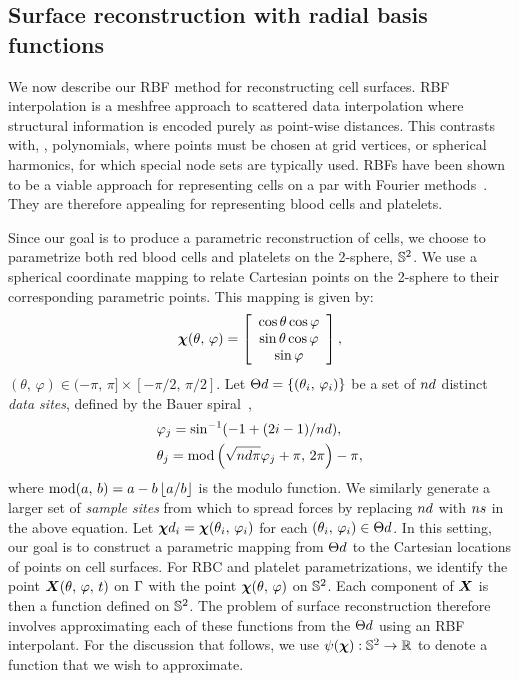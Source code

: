 \subsection{Surface reconstruction with radial basis functions}\label{sec:rbf-interpolation}

We now describe our RBF method for reconstructing cell surfaces. RBF interpolation is a
meshfree approach to scattered data interpolation where structural information is encoded
purely as point-wise distances. This contrasts with, , polynomials, where
points must be chosen at grid vertices, or spherical harmonics, for which special node
sets are typically used. RBFs have been shown to be a viable approach for representing
cells on a par with Fourier methods~\cite{Shankar:2013ki}. They are therefore appealing
for representing blood cells and platelets.

Since our goal is to produce a parametric reconstruction of cells, we choose to
parametrize both red blood cells and platelets on the 2-sphere, $\mathbb{S}^2$. We use a
spherical coordinate mapping to relate Cartesian points on the 2-sphere to their
corresponding parametric points. This mapping is given by:
\begin{equation}
    \boldsymbol{\chi}(\theta,\,\varphi) =
    \left[\begin{array}{c}
        \cos\theta\cos\varphi \\
        \sin\theta\cos\varphi \\
        \sin\varphi
    \end{array}\right],
\end{equation}
$(\theta,\,\varphi)\in(-\pi,\,\pi]\times[-\pi/2,\,\pi/2]$. Let
$\data\sites = \{(\theta_i,\,\varphi_i)\}$ be a set of $\data\cardinality$ distinct
\emph{data sites}, defined by the Bauer spiral~\cite{Bauer:2000km},
\begin{equation}\label{eq:bauer-spiral}
    \begin{aligned}
        &\varphi_j = \sin^{-1}(-1 + (2i - 1) / \data\cardinality), \\
        &\theta_j = \modulo\left(\sqrt{\data\cardinality\pi}\varphi_j + \pi,\,2\pi\right) - \pi,
    \end{aligned}
\end{equation}
where $\operatorname{mod}(a,\,b) = a - b\left\lfloor{a/b}\right\rfloor$ is the modulo function. We similarly generate
a larger set of \emph{sample sites} from which to spread forces by replacing $\data\cardinality$
with $\sample\cardinality$ in the above equation. Let
$\data\Xp_i=\Xp(\theta_i,\,\varphi_i)$ for each $(\theta_i,\,\varphi_i)\in\data\sites$.
In this setting, our goal is to construct a parametric mapping from $\data\sites$ to the
Cartesian locations of points on cell surfaces. For RBC and platelet parametrizations, we
identify the point $\boldsymbol{X}(\theta,\,\varphi,\,t)$ on $\Gamma$ with the point
$\boldsymbol{\chi}(\theta,\,\varphi)$ on $\mathbb{S}^2$. Each component of $\boldsymbol{X}$ is then a function defined
on $\mathbb{S}^2$. The problem of surface reconstruction therefore involves approximating each
of these functions from the $\data\sites$ using an RBF interpolant. For the discussion
that follows, we use $\psi(\boldsymbol{\chi}):\mathbb{S}^2\to\mathbb{R}$ to denote a function that we wish to
approximate.


